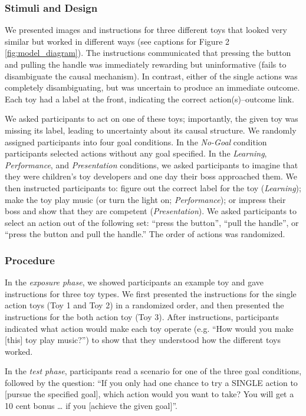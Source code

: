 \documentclass[10pt, letterpaper]{article}
\begin{document}
\subsubsection{Stimuli and Design}\label{stimuli-and-design}

We presented images and instructions for three different toys that
looked very similar but worked in different ways (see captions for
Figure 2 \ref{fig:model_diagram}). The instructions communicated that
pressing the button and pulling the handle was immediately rewarding but
uninformative (fails to disambiguate the causal mechanism). In contrast,
either of the single actions was completely disambiguating, but was
uncertain to produce an immediate outcome. Each toy had a label at the
front, indicating the correct action(s)--outcome link.

We asked participants to act on one of these toys; importantly, the
given toy was missing its label, leading to uncertainty about its causal
structure. We randomly assigned participants into four goal conditions.
In the \emph{No-Goal} condition participants selected actions without
any goal specified. In the \emph{Learning}, \emph{Performance}, and
\emph{Presentation} conditions, we asked participants to imagine that
they were children's toy developers and one day their boss approached
them. We then instructed participants to: figure out the correct label
for the toy (\emph{Learning}); make the toy play music (or turn the
light on; \emph{Performance}); or impress their boss and show that they
are competent (\emph{Presentation}). We asked participants to select an
action out of the following set: ``press the button'', ``pull the
handle'', or ``press the button and pull the handle.'' The order of
actions was randomized.

\subsubsection{Procedure}\label{procedure}

In the \emph{exposure phase}, we showed participants an example toy and
gave instructions for three toy types. We first presented the
instructions for the single action toys (Toy 1 and Toy 2) in a
randomized order, and then presented the instructions for the both
action toy (Toy 3). After instructions, participants indicated what
action would make each toy operate (e.g. ``How would you make {[}this{]}
toy play music?'') to show that they understood how the different toys
worked.

In the \emph{test phase}, participants read a scenario for one of the
three goal conditions, followed by the question: ``If you only had one
chance to try a SINGLE action to {[}pursue the specified goal{]}, which
action would you want to take? You will get a 10 cent bonus \ldots{} if
you {[}achieve the given goal{]}''.
\end{document}
